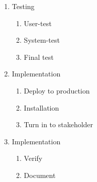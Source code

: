 \begin{framed}
\begin{enumerate}
\begin{enumerate}
        \item Testing
        \begin{enumerate}
            \item  User-test
            \item System-test  
            \item Final test
        \end{enumerate}

        \item Implementation
        \begin{enumerate}
            \item  Deploy to production
            \item Installation
            \item Turn in to stakeholder
        \end{enumerate}

        \item Implementation
        \begin{enumerate}
            \item Verify
            \item Document
        \end{enumerate}
    \end{enumerate}
    \end{enumerate}
\end{framed}

